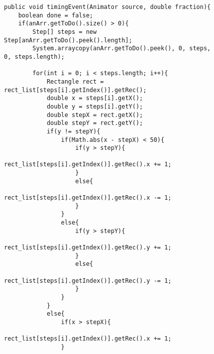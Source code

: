 \begin{figure}
\begin{center}
\begin{verbatim}
public void timingEvent(Animator source, double fraction){
    boolean done = false;
    if(anArr.getToDo().size() > 0){
        Step[] steps = new Step[anArr.getToDo().peek().length];
        System.arraycopy(anArr.getToDo().peek(), 0, steps, 0, steps.length);

        for(int i = 0; i < steps.length; i++){                    
            Rectangle rect = rect_list[steps[i].getIndex()].getRec();
            double x = steps[i].getX();
            double y = steps[i].getY();
            double stepX = rect.getX();
            double stepY = rect.getY();
            if(y != stepY){
                if(Math.abs(x - stepX) < 50){
                    if(y > stepY){
                        rect_list[steps[i].getIndex()].getRec().x += 1;
                    }
                    else{
                        rect_list[steps[i].getIndex()].getRec().x -= 1;
                    }
                }
                else{
                    if(y > stepY){
                        rect_list[steps[i].getIndex()].getRec().y += 1;
                    }
                    else{
                        rect_list[steps[i].getIndex()].getRec().y -= 1;
                    }
                }
            }
            else{
                if(x > stepX){
                    rect_list[steps[i].getIndex()].getRec().x += 1;
                }
                else{
                    rect_list[steps[i].getIndex()].getRec().x -= 1;
                }
            }
            if(y == stepY && x == stepX){
                done = true;
                anArr.getToDo().poll();
                anArr.getDone().add(steps);
                break;
            }
        }
        repaint();              

    }
\end{verbatim}
\end{center}
\caption{Arthur example code making an animated change in coordinates}
\label{fig:arthurPrototype}
\end{figure}